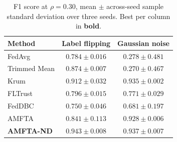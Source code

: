 \begin{table}[H]
	\caption{F1 score at $\rho=0.30$, mean $\pm$ across-seed sample standard deviation over three seeds. Best per column in \textbf{bold}.}
	\label{tab:f1}
	\centering
	\begin{tabular}{@{}lcc@{}}
		\toprule
		\textbf{Method} & \textbf{Label flipping} & \textbf{Gaussian noise}\\
		\midrule
		FedAvg & $0.784\pm0.016$ & $0.278\pm0.481$\\
		Trimmed Mean & $0.874\pm0.007$ & $0.270\pm0.467$\\
		Krum & $0.912\pm0.032$ & $0.935\pm0.002$\\
		FLTrust & $0.796\pm0.015$ & $0.771\pm0.029$\\
		FedDBC & $0.750\pm0.046$ & $0.681\pm0.197$\\
		AMFTA & $0.841\pm0.113$ & $0.928\pm0.006$\\
		\textbf{AMFTA-ND} & $\mathbf{0.943}\pm0.008$ & $\mathbf{0.937}\pm0.007$\\
		\bottomrule
	\end{tabular}
\end{table}
